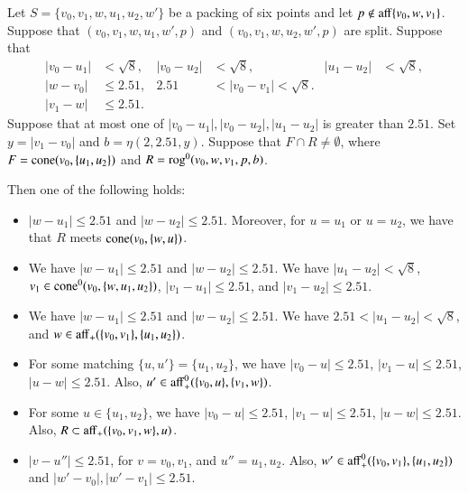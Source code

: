 \begin{tarskidata}
\begin{tarski}

\begin{lemma}
 Let $S=\{v_0,v_1,w,u_1,u_2,w'\}$ be a packing of six points and let $p\not\in{\operatorname{aff}}\{v_0,w,v_1\}$.
Suppose  that $(v_0,v_1,w,u_1,w',p)$ and $(v_0,v_1,w,u_2,w',p)$ are split.
Suppose that 
   $$
   \begin{array}{rlrlrll}
   |v_0-u_1|&<\sqrt8,& |v_0-u_2|&<\sqrt8,& |u_1-u_2|&<\sqrt8,\\
   |w-v_0|&\le 2.51, &2.51&<|v_0-v_1|<\sqrt8.\\
   |v_1-w|&\le 2.51.
   \end{array}
   $$
Suppose that at most one of $|v_0-u_1|,|v_0-u_2|,|u_1-u_2|$ is
greater than $2.51$.
%
Set $y=|v_1-v_0|$ and $b=\eta(2,2.51,y)$.
Suppose that $F\cap R\ne\emptyset$, 
where $F={\operatorname{cone}}(v_0,\{u_1,u_2\})$ and
$R={\operatorname{rog}}^0(v_0,w,v_1,p,b)$.

Then one of the following holds:
  \begin{itemize}
  \item
  $|w-u_1|\le 2.51$ and  $|w-u_2|\le 2.51$.
  Moreover, for $u=u_1$ or $u=u_2$, we have that
  $R$ meets ${\operatorname{cone}}(v_0,\{w,u\})$.
  \item  We have $|w-u_1|\le 2.51$ and  $|w-u_2|\le 2.51$.
  We have $|u_1-u_2|<\sqrt8$, 
  $v_1\in{\operatorname{cone}}^0(v_0,\{w,u_1,u_2\})$, 
  $|v_1-u_1|\le 2.51$, and $|v_1-u_2|\le 2.51$.
  \item  We have $|w-u_1|\le 2.51$ and  $|w-u_2|\le 2.51$.
  We have $2.51<|u_1-u_2|<\sqrt8$, and 
  $w\in{\operatorname{aff}}_+(\{v_0,v_1\},\{u_1,u_2\})$.
  \item For some matching $\{u,u'\}=\{u_1,u_2\}$, we have
  $|v_0-u|\le 2.51$, $|v_1-u|\le 2.51$, $|u-w|\le 2.51$.
   Also, $u'\in {\operatorname{aff}}_+^0(\{v_0,u\},\{v_1,w\})$.
  \item For some $u\in\{u_1,u_2\}$, we have
   $|v_0-u|\le 2.51$, $|v_1-u|\le 2.51$, $|u-w|\le 2.51$.
  Also, $R\subset {\operatorname{aff}}_+(\{v_0,v_1,w\},u)$.
  \item $|v-u''|\le 2.51$, for $v=v_0,v_1$, and $u''=u_1,u_2$.  Also,
   $w'\in{\operatorname{aff}}_+^0(\{v_0,v_1\},\{u_1,u_2\})$ and
   $|w'-v_0|,|w'-v_1|\le 2.51$.
  \end{itemize}
\end{lemma}



\end{tarski}
\end{tarskidata}
